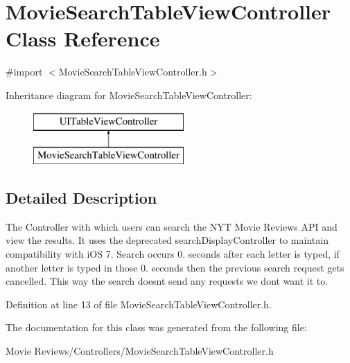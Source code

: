 \section{Movie\+Search\+Table\+View\+Controller Class Reference}
\label{interface_movie_search_table_view_controller}


{\ttfamily \#import $<$Movie\+Search\+Table\+View\+Controller.\+h$>$}

Inheritance diagram for Movie\+Search\+Table\+View\+Controller\+:\begin{figure}[H]
\begin{center}
\leavevmode
\includegraphics[height=2.000000cm]{interface_movie_search_table_view_controller}
\end{center}
\end{figure}


\subsection{Detailed Description}
The Controller with which users can search the N\+Y\+T Movie Reviews A\+P\+I and view the results. It uses the deprecated search\+Display\+Controller to maintain compatibility with i\+O\+S 7. Search occurs 0. seconds after each letter is typed, if another letter is typed in those 0. seconds then the previous search request gets cancelled. This way the search doesnt send any requests we dont want it to. 

Definition at line 13 of file Movie\+Search\+Table\+View\+Controller.\+h.



The documentation for this class was generated from the following file\+:\begin{DoxyCompactItemize}
\item 
Movie Reviews/\+Controllers/Movie\+Search\+Table\+View\+Controller.\+h\end{DoxyCompactItemize}
